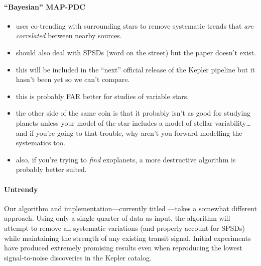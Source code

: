 \documentclass[letterpaper,12pt,preprint]{hack_aastex}
\newcommand{\Untrendy}{\package{Untrendy}}
\begin{document}
\paragraph{``Bayesian'' MAP-PDC}
\begin{itemize}
\item uses co-trending with surrounding stars to remove systematic trends that
\emph{are correlated} between nearby sources.
\item should also deal with SPSDs (word on the street) but the paper doesn't
exist.
\item this will be included in the ``next'' official release of the Kepler
pipeline but it hasn't been yet so we can't compare.
\item this is probably FAR better for studies of variable stars.
\item the other side of the same coin is that it probably isn't as good for
studying planets unless your model of the star includes a model of stellar
variability\ldots and if you're going to that trouble, why aren't you forward
modelling the systematics too.
\item also, if you're trying to \emph{find} exoplanets, a more destructive
algorithm is probably better suited.
\end{itemize}


\paragraph{Untrendy}
Our algorithm and implementation---currently titled \Untrendy---takes a
somewhat different approach.
Using only a single quarter of data as input, the algorithm will attempt to
remove all systematic variations (and properly account for SPSDs) while
maintaining the strength of any existing transit signal.
Initial experiments have produced extremely promising results even when
reproducing the lowest signal-to-noise discoveries in the Kepler catalog.
\end{document}
